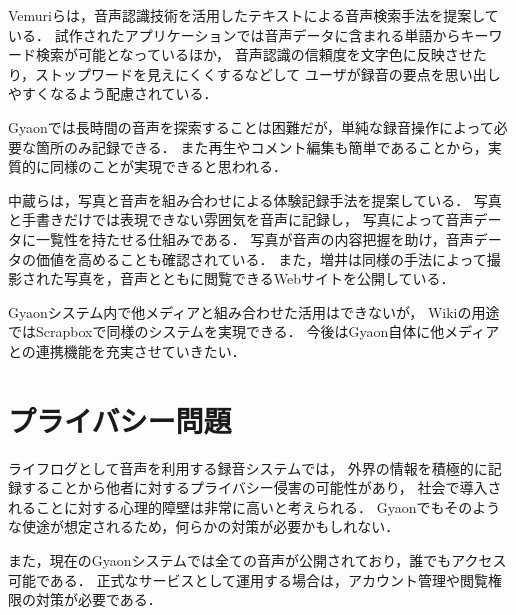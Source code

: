 Vemuriらは，音声認識技術を活用したテキストによる音声検索手法を提案している\cite{Vemuri}．
試作されたアプリケーションでは音声データに含まれる単語からキーワード検索が可能となっているほか，
音声認識の信頼度を文字色に反映させたり，ストップワードを見えにくくするなどして
ユーザが録音の要点を思い出しやすくなるよう配慮されている．

Gyaonでは長時間の音声を探索することは困難だが，単純な録音操作によって必要な箇所のみ記録できる．
また再生やコメント編集も簡単であることから，実質的に同様のことが実現できると思われる．

\vspace{0.25in}

中蔵らは，写真と音声を組み合わせによる体験記録手法を提案している\cite{Nakakura}．
写真と手書きだけでは表現できない雰囲気を音声に記録し，
写真によって音声データに一覧性を持たせる仕組みである．
写真が音声の内容把握を助け，音声データの価値を高めることも確認されている．
また，増井は同様の手法によって撮影された写真を，音声とともに閲覧できるWebサイトを公開している\cite{Masui}．

Gyaonシステム内で他メディアと組み合わせた活用はできないが，
Wikiの用途ではScrapboxで同様のシステムを実現できる．
今後はGyaon自体に他メディアとの連携機能を充実させていきたい．

\section{プライバシー問題}
ライフログとして音声を利用する録音システムでは，
外界の情報を積極的に記録することから他者に対するプライバシー侵害の可能性があり，
社会で導入されることに対する心理的障壁は非常に高いと考えられる\cite{Kawamura}．
Gyaonでもそのような使途が想定されるため，何らかの対策が必要かもしれない．

また，現在のGyaonシステムでは全ての音声が公開されており，誰でもアクセス可能である．
正式なサービスとして運用する場合は，アカウント管理や閲覧権限の対策が必要である．